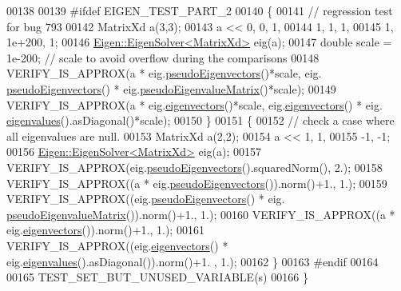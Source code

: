 \begin{DoxyCode}
00138   
00139 \textcolor{preprocessor}{#ifdef EIGEN\_TEST\_PART\_2}
00140   \{
00141     \textcolor{comment}{// regression test for bug 793}
00142     MatrixXd a(3,3);
00143     a << 0,  0,  1,
00144         1,  1, 1,
00145         1, 1e+200,  1;
00146     \hyperlink{group___eigenvalues___module_class_eigen_1_1_eigen_solver}{Eigen::EigenSolver<MatrixXd>} eig(a);
00147     \textcolor{keywordtype}{double} scale = 1e-200; \textcolor{comment}{// scale to avoid overflow during the comparisons}
00148     VERIFY\_IS\_APPROX(a * eig.\hyperlink{group___eigenvalues___module_a4e796226f06e1f7347cf03a38755a155}{pseudoEigenvectors}()*scale, eig.
      \hyperlink{group___eigenvalues___module_a4e796226f06e1f7347cf03a38755a155}{pseudoEigenvectors}() * eig.\hyperlink{group___eigenvalues___module_a4979eafe0aeef06b19ada7fa5e19db17}{pseudoEigenvalueMatrix}()*scale);
00149     VERIFY\_IS\_APPROX(a * eig.\hyperlink{group___eigenvalues___module_a66288022802172e3ee059283b26201d7}{eigenvectors}()*scale, eig.\hyperlink{group___eigenvalues___module_a66288022802172e3ee059283b26201d7}{eigenvectors}() * eig.
      \hyperlink{group___eigenvalues___module_a114189009e42f5e03372a7a3dfa33b97}{eigenvalues}().asDiagonal()*scale);
00150   \}
00151   \{
00152     \textcolor{comment}{// check a case where all eigenvalues are null.}
00153     MatrixXd a(2,2);
00154     a << 1,  1,
00155         -1, -1;
00156     \hyperlink{group___eigenvalues___module_class_eigen_1_1_eigen_solver}{Eigen::EigenSolver<MatrixXd>} eig(a);
00157     VERIFY\_IS\_APPROX(eig.\hyperlink{group___eigenvalues___module_a4e796226f06e1f7347cf03a38755a155}{pseudoEigenvectors}().squaredNorm(), 2.);
00158     VERIFY\_IS\_APPROX((a * eig.\hyperlink{group___eigenvalues___module_a4e796226f06e1f7347cf03a38755a155}{pseudoEigenvectors}()).norm()+1., 1.);
00159     VERIFY\_IS\_APPROX((eig.\hyperlink{group___eigenvalues___module_a4e796226f06e1f7347cf03a38755a155}{pseudoEigenvectors}() * eig.
      \hyperlink{group___eigenvalues___module_a4979eafe0aeef06b19ada7fa5e19db17}{pseudoEigenvalueMatrix}()).norm()+1., 1.);
00160     VERIFY\_IS\_APPROX((a * eig.\hyperlink{group___eigenvalues___module_a66288022802172e3ee059283b26201d7}{eigenvectors}()).norm()+1., 1.);
00161     VERIFY\_IS\_APPROX((eig.\hyperlink{group___eigenvalues___module_a66288022802172e3ee059283b26201d7}{eigenvectors}() * eig.\hyperlink{group___eigenvalues___module_a114189009e42f5e03372a7a3dfa33b97}{eigenvalues}().asDiagonal()).norm()+1.
      , 1.);
00162   \}
00163 \textcolor{preprocessor}{#endif}
00164   
00165   TEST\_SET\_BUT\_UNUSED\_VARIABLE(s)
00166 \}
\end{DoxyCode}

